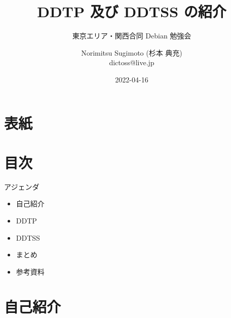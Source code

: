 \title{DDTP 及び DDTSS の紹介}
\subtitle{東京エリア・関西合同 Debian 勉強会} %
\author{Norimitsu Sugimoto (杉本 典充) \\dictoss@live.jp}
\date{2022-04-16}



\section{表紙}

\begin{frame}
  \titlepage{}
\end{frame}


\section{目次}

\begin{frame}{アジェンダ}
  \begin{itemize}
  \item 自己紹介
  \item DDTP
  \item DDTSS
  \item まとめ
  \item 参考資料
  \end{itemize}
\end{frame}


\section{自己紹介}

